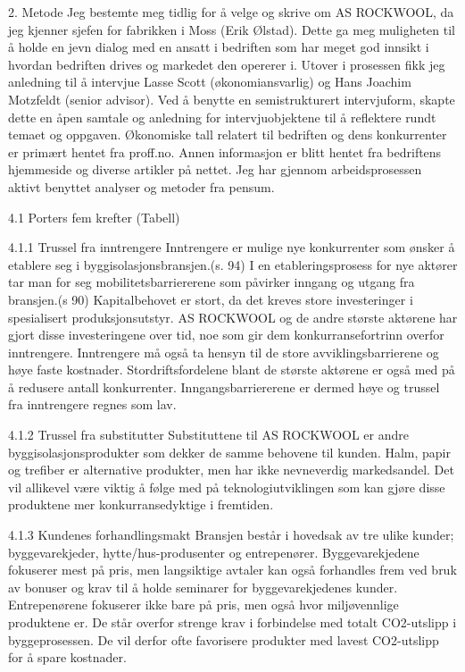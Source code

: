 2. Metode
Jeg bestemte meg tidlig for å velge og skrive om AS ROCKWOOL, da jeg kjenner sjefen for fabrikken i Moss (Erik Ølstad). Dette ga meg muligheten til å holde en jevn dialog med en ansatt i bedriften som har meget god innsikt i hvordan bedriften drives og markedet den opererer i. Utover i prosessen fikk jeg anledning til å intervjue Lasse Scott (økonomiansvarlig) og Hans Joachim Motzfeldt (senior advisor). Ved å benytte en semistrukturert intervjuform, skapte dette en åpen samtale og anledning for intervjuobjektene til å reflektere rundt temaet og oppgaven. Økonomiske tall relatert til bedriften og dens konkurrenter er primært hentet fra proff.no. Annen informasjon er blitt hentet fra bedriftens hjemmeside og diverse artikler på nettet. Jeg har gjennom arbeidsprosessen aktivt benyttet analyser og metoder fra pensum.




4.1 Porters fem krefter
(Tabell)

4.1.1 Trussel fra inntrengere
Inntrengere er mulige nye konkurrenter som ønsker å etablere seg i byggisolasjonsbransjen.(s. 94) I en etableringsprosess for nye aktører tar man for seg mobilitetsbarriererene som påvirker inngang og utgang fra bransjen.(s 90) Kapitalbehovet er stort, da det kreves store investeringer i spesialisert produksjonsutstyr. AS ROCKWOOL og de andre største aktørene  har gjort disse investeringene over tid, noe som gir dem konkurransefortrinn overfor inntrengere. Inntrengere må også ta hensyn til de store avviklingsbarrierene og høye faste kostnader. Stordriftsfordelene blant de største aktørene er også med på å redusere antall konkurrenter. Inngangsbarriererene er dermed høye og trussel fra inntrengere regnes som lav.
 
4.1.2 Trussel fra substitutter
Substituttene til AS ROCKWOOL er andre byggisolasjonsprodukter som dekker de samme behovene til kunden. Halm, papir og trefiber er alternative produkter, men har ikke nevneverdig markedsandel. Det vil allikevel være viktig å følge med på teknologiutviklingen som kan gjøre disse produktene mer konkurransedyktige i fremtiden.


4.1.3 Kundenes forhandlingsmakt
Bransjen består i hovedsak av tre ulike kunder; byggevarekjeder, hytte/hus-produsenter og entrepenører. Byggevarekjedene fokuserer mest på pris, men langsiktige avtaler kan også forhandles frem ved bruk av bonuser og krav til å holde seminarer for byggevarekjedenes kunder. Entrepenørene fokuserer ikke bare på pris, men også hvor miljøvennlige produktene er. De står overfor strenge krav i forbindelse med totalt CO2-utslipp i byggeprosessen. De vil derfor ofte favorisere produkter med lavest CO2-utslipp for å spare kostnader.
 
